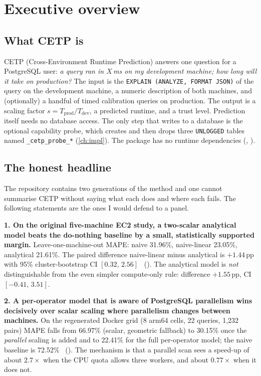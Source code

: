 \chapter{Executive overview}\label{ch:exec}

\section{What CETP is}
CETP (Cross-Environment Runtime Prediction) answers one question for a PostgreSQL user: \emph{a query
ran in $X$\,ms on my development machine; how long will it take on production?} The input is the
\texttt{EXPLAIN (ANALYZE, FORMAT JSON)} of the query on the development machine, a numeric description
of both machines, and (optionally) a handful of timed calibration queries on production. The output
is a scaling factor $s=T_{\text{prod}}/T_{\text{dev}}$, a predicted runtime, and a trust level.
Prediction itself needs no database access. The only step that writes to a database is the optional
capability probe, which creates and then drops three \texttt{UNLOGGED} tables named \texttt{\_cetp\_probe\_*}
(\cref{ch:impl}). The package has no runtime dependencies (, \evFILE).

\section{The honest headline}
The repository contains two generations of the method and one cannot summarise CETP without saying
what each does and where each fails. The following statements are the ones I would defend to a panel.

\begin{finding}
\textbf{1. On the original five-machine EC2 study, a two-scalar analytical model beats the
do-nothing baseline by a small, statistically supported margin.} Leave-one-machine-out MAPE: naive
31.96\%, naive-linear 23.05\%, analytical 21.61\%. The paired difference naive-linear minus analytical
is $+1.44$\,pp with 95\% cluster-bootstrap CI $[0.32,\,2.56]$ \evFILE\
(). The analytical model is \emph{not} distinguishable from the
even simpler compute-only rule: difference $+1.55$\,pp, CI $[-0.41,\,3.51]$.
\end{finding}

\begin{finding}
\textbf{2. A per-operator model that is aware of PostgreSQL parallelism wins decisively over
scalar scaling where parallelism changes between machines.} On the regenerated Docker grid (8
arm64 cells, 22 queries, 1{,}232 pairs) MAPE falls from 66.97\% (scalar, geometric fallback) to
30.15\% once the \emph{parallel} scaling is added and to 22.41\% for the full per-operator model; the
naive baseline is 72.52\% \evFILE\ (\src{results/operator_model_metrics.json}). The mechanism is that
a parallel scan sees a speed-up of about $2.7\times$ when the CPU quota allows three workers, and about
$0.77\times$ when it does not.
\end{finding}


